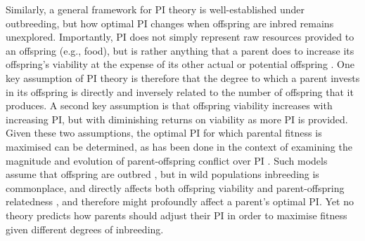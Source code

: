 \documentclass[12pt]{article}
\begin{document}
Similarly, a general framework for PI theory is well-established under outbreeding, but how optimal PI changes when offspring are inbred remains unexplored. Importantly, PI does not simply represent raw resources provided to an offspring (e.g., food), but is rather anything that a parent does to increase its offspring's viability at the expense of its other actual or potential offspring \cite[][]{Trivers1972, Trivers1974}. One key assumption of PI theory is therefore that the degree to which a parent invests in its offspring is directly and inversely related to the number of offspring that it produces. A second key assumption is that offspring viability increases with increasing PI, but with diminishing returns on viability as more PI is provided. Given these two assumptions, the optimal PI for which parental fitness is maximised can be determined, as has been done in the context of examining the magnitude and evolution of parent-offspring conflict over PI \cite[e.g.,][]{Macnair1978, Parker1978, Parker1985, DeJong2005, Kuijper2012}. Such models assume that offspring are outbred \cite[or result from self-fertilisation,][]{DeJong2005}, but in wild populations inbreeding is  commonplace, and directly affects both offspring viability and parent-offspring relatedness \cite[][]{OGrady2006, Charlesworth2009}, and therefore might profoundly affect a parent's optimal PI. Yet no theory predicts how parents should adjust their PI in order to maximise fitness given different degrees of inbreeding. %
\end{document}
